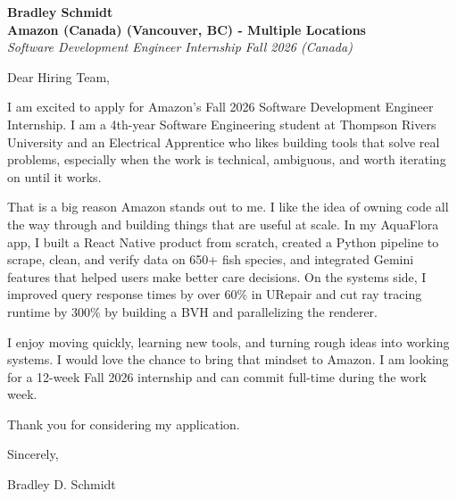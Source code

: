 \documentclass[11pt]{article}
\begin{document}
\textbf{Bradley Schmidt}\\
\vspace{0.5em}
\textbf{Amazon (Canada) (Vancouver, BC) - Multiple Locations}\\
\textit{Software Development Engineer Internship Fall 2026 (Canada)}

Dear Hiring Team,

\par

I am excited to apply for Amazon's Fall 2026 Software Development Engineer Internship. I am a 4th-year Software Engineering student at Thompson Rivers University and an Electrical Apprentice who likes building tools that solve real problems, especially when the work is technical, ambiguous, and worth iterating on until it works.

\par

That is a big reason Amazon stands out to me. I like the idea of owning code all the way through and building things that are useful at scale. In my AquaFlora app, I built a React Native product from scratch, created a Python pipeline to scrape, clean, and verify data on 650+ fish species, and integrated Gemini features that helped users make better care decisions. On the systems side, I improved query response times by over 60\% in URepair and cut ray tracing runtime by 300\% by building a BVH and parallelizing the renderer.

\par

I enjoy moving quickly, learning new tools, and turning rough ideas into working systems. I would love the chance to bring that mindset to Amazon. I am looking for a 12-week Fall 2026 internship and can commit full-time during the work week.

\par

Thank you for considering my application.

\par

Sincerely,

\par

Bradley D. Schmidt
\end{document}

